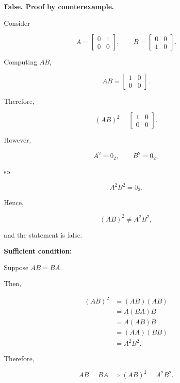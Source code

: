 \begin{enumerate}[label=\alph*)]
\begin{answer}
    \textbf{False. Proof by counterexample.}

    Consider

    $$
    A=\begin{bmatrix}
        0 & 1 \\
        0 & 0
    \end{bmatrix},
    \qquad
    B=\begin{bmatrix}
        0 & 0 \\
        1 & 0
    \end{bmatrix}.
    $$

    Computing $AB$,

    $$
    AB=\begin{bmatrix}
        1 & 0 \\
        0 & 0
    \end{bmatrix}.
    $$

    Therefore,

    $$
    (AB)^2=\begin{bmatrix}
        1 & 0 \\
        0 & 0
    \end{bmatrix}.
    $$

    However,

    $$
    A^2=0_2,
    \qquad B^2=0_2,
    $$

    so

    $$
    A^2B^2=0_2.
    $$

    Hence,

    $$
    (AB)^2\neq A^2B^2,
    $$

    and the statement is false.

    \par\bigskip
    \noindent\textbf{Sufficient condition:}

    Suppose $AB=BA$.

    Then,

    $$
    \begin{aligned}
        (AB)^2
        &=(AB)(AB) \\
        &=A(BA)B \\
        &=A(AB)B \\
        &=(AA)(BB) \\
        &=\boxed{A^2B^2}.
    \end{aligned}
    $$

    Therefore,

    $$
    \boxed{
        AB=BA\implies(AB)^2=A^2B^2.
    }
    $$
\end{answer}

\end{enumerate}
